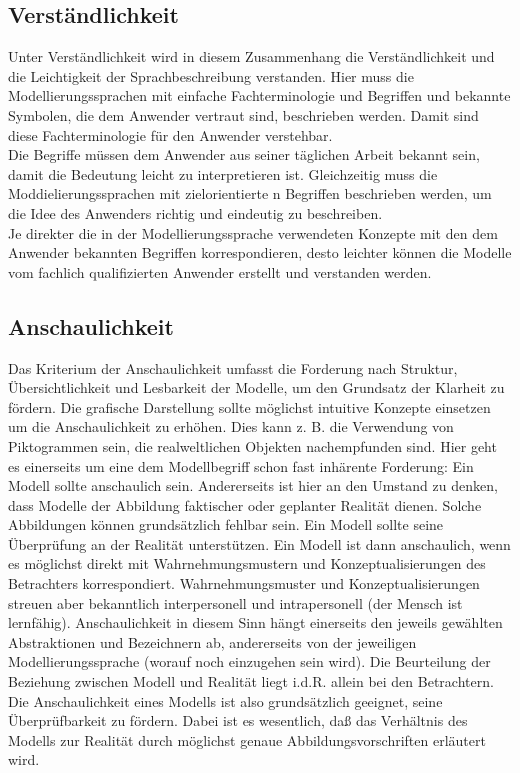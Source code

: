 \subsection{Verständlichkeit}
\label{sc:Verständlichkeit}
Unter Verständlichkeit wird in diesem Zusammenhang die Verständlichkeit und die Leichtigkeit der Sprachbeschreibung verstanden. Hier muss die Modellierungssprachen mit einfache Fachterminologie und Begriffen und bekannte Symbolen, die dem Anwender vertraut sind, beschrieben werden. Damit sind diese Fachterminologie für den Anwender verstehbar. \\
Die Begriffe müssen dem Anwender aus seiner täglichen Arbeit bekannt sein, damit die Bedeutung leicht zu interpretieren ist\cite{MT014}.
Gleichzeitig muss die Moddielierungssprachen mit zielorientierte n 
Begriffen beschrieben werden, um die Idee des Anwenders richtig und eindeutig zu beschreiben.\\
Je direkter die in der Modellierungssprache verwendeten
Konzepte mit den dem Anwender bekannten Begriffen
korrespondieren, desto leichter können die Modelle
vom fachlich qualifizierten Anwender erstellt
und verstanden werden\cite{MT006}.

\subsection{Anschaulichkeit}
\label{sc:Anschaulichkeit}
Das Kriterium der Anschaulichkeit umfasst die Forderung nach Struktur, Übersichtlichkeit und Lesbarkeit der Modelle, um den Grundsatz der Klarheit zu fördern. Die grafische Darstellung sollte möglichst intuitive Konzepte einsetzen um die Anschaulichkeit zu erhöhen. Dies kann z. B. die Verwendung von Piktogrammen sein, die realweltlichen Objekten nachempfunden sind\cite{MT007}.
Hier geht es einerseits um eine dem Modellbegriff schon fast inhärente Forderung: Ein Modell sollte
anschaulich sein. Andererseits ist hier an den Umstand zu denken, dass Modelle der Abbildung faktischer
oder geplanter Realität dienen. Solche Abbildungen können grundsätzlich fehlbar sein. Ein
Modell sollte seine Überprüfung an der Realität unterstützen.
Ein Modell ist dann anschaulich, wenn es möglichst direkt mit Wahrnehmungsmustern und Konzeptualisierungen
des Betrachters korrespondiert. Wahrnehmungsmuster und Konzeptualisierungen
streuen aber bekanntlich interpersonell und intrapersonell (der Mensch ist lernfähig). Anschaulichkeit
in diesem Sinn hängt einerseits den jeweils gewählten Abstraktionen und Bezeichnern ab, andererseits
von der jeweiligen Modellierungssprache (worauf noch einzugehen sein wird). Die Beurteilung der
Beziehung zwischen Modell und Realität liegt i.d.R. allein bei den Betrachtern. Die Anschaulichkeit
eines Modells ist also grundsätzlich geeignet, seine Überprüfbarkeit zu fördern. Dabei ist es wesentlich,
daß das Verhältnis des Modells zur Realität durch möglichst genaue Abbildungsvorschriften
erläutert wird.\cite{MT010}

